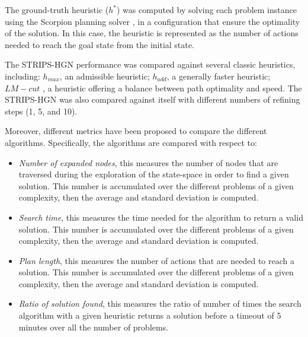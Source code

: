 The ground-truth heuristic ($h^{*}$) was computed by solving each problem instance using the Scorpion planning solver \cite{seipp2020saturated}, in a configuration that ensure the optimality of the solution. In this case, the heuristic is represented as the number of actions needed to reach the goal state from the initial state.

The STRIPS-HGN performance was compared against several classic heuristics, including:
$h_{max}$, an admissible heuristic; $h_{add}$, a generally faster heuristic; $LM-cut$ \cite{richter2010lama}, a heuristic offering a balance between path optimality and speed. The STRIPS-HGN was also compared against itself with different numbers of refining steps (1, 5, and 10).

Moreover, different metrics have been proposed to compare the different algorithms. Specifically, the algorithms are compared with respect to:
\begin{itemize}
    \item \textit{Number of expanded nodes}, this measures the number of nodes that are traversed during the exploration of the state-space in order to find a given solution. This number is accumulated over the different problems of a given complexity, then the average and standard deviation is computed.
    \item \textit{Search time}, this measures the time needed for the algorithm to return a valid solution.  This number is accumulated over the different problems of a given complexity, then the average and standard deviation is computed.
    \item \textit{Plan length}, this measures the number of actions that are needed to reach a solution. This number is accumulated over the different problems of a given complexity, then the average and standard deviation is computed.
    \item \textit{Ratio of solution found}, this measures the ratio of number of times the search algorithm with a given heuristic returns a solution before a timeout of 5 minutes over all the number of problems.
\end{itemize}

